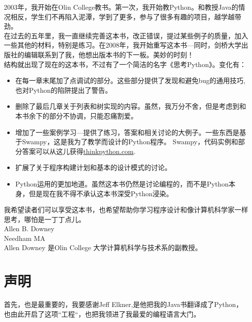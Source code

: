 \documentclass[10pt]{book}
\begin{document}
 2003年，我开始在Olin College教书。第一次，我开始教Python。和教授Java的情况相反，学生们不再陷入泥潭，学到了更多，参与了很多有趣的项目，越学越带劲。\\

 在过去的五年里，我一直继续完善这本书，改正错误，提过某些例子的质量，加入一些其他的材料，特别是练习。在2008年，我开始重写这本书---同时，剑桥大学出版社的编辑联系到了我，他想出版本书的下一板。美妙的时刻！\\

 结构就出现了现在的这本书，不过有了一个简洁的名字《思考Python》。变化有：
 \begin{itemize}

 \item 在每一章末尾加了点调试的部分。这些部分提供了发现和避免bug的通用技巧,也对Python的陷阱提出了警告。

 \item 删除了最后几章关于列表和树实现的内容。虽然，我万分不舍，但是考虑到和本书余下的部分不协调，只能忍痛割爱。

 \item 增加了一些案例学习---提供了练习，答案和相关讨论的大例子。一些东西是基于Swampy，这是我为了教学而设计的Python程序。
 Swampy，代码实例和部分答案可以从这儿获得\url{thinkpython.com}.

 \item 扩展了关于程序构建计划和基本的设计模式的讨论。

 \item Python运用的更加地道。虽然这本书仍然是讨论编程的，而不是Python本身，但是现在我不得不承认这本书深受Python浸染。
 
 \end{itemize}

  我希望读者们可以享受这本书，也希望帮助你学习程序设计和像计算机科学家一样思考，哪怕是一丁丁点儿。\\

Allen B. Downey\\
Needham MA\\

Allen Downey 是Olin College 大学计算机科学与技术系的副教授。



\section*{声明}

首先，也是最重要的，我要感谢Jeff Elkner,是他把我的Java书翻译成了Python，也由此开启了这项“工程“，也把我领进了我最爱的编程语言大门。\\
\end{document}
